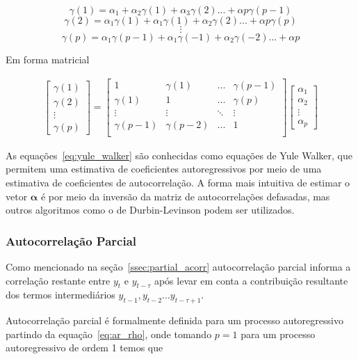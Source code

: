 $$\gamma(1) = \alpha_{1} + \alpha_{2}\gamma(1) + \alpha_{3}\gamma(2) ... + \alpha{p}\gamma(p-1)$$
$$\gamma(2) = \alpha_{1}\gamma(1) + \alpha_{1}\gamma(1) + \alpha_{2}\gamma(2) ... + \alpha{p}\gamma(p)$$
$$\vdots$$
$$\gamma(p) = \alpha_{1}\gamma(p-1) + \alpha_{1}\gamma(-1) + \alpha_{2}\gamma(-2) ... + \alpha{p}$$

Em forma matricial

\begin{gather}\label{eq:yule_walker}
  \begin{bmatrix} \gamma(1) \\ \gamma(2) \\ \vdots \\ \gamma(p) \end{bmatrix}
  =
  \begin{bmatrix}
      1 & \gamma(1) & ... & \gamma(p-1) \\
      \gamma(1) & 1 & ... & \gamma(p) \\
      \vdots & \vdots & \ddots & \vdots \\
      \gamma(p-1) & \gamma(p-2) & ... & 1 \\
  \end{bmatrix}
  \begin{bmatrix} \alpha_{1} \\ \alpha_{2} \\ \vdots \\ \alpha_{p} \end{bmatrix}
\end{gather}

As equações~\ref{eq:yule_walker} são conhecidas como equações de Yule Walker,
que permitem uma estimativa de coeficientes autoregressivos por meio de uma
estimativa de coeficientes de autocorrelação. A forma mais intuitiva de estimar
o vetor $\mathbf{\alpha}$ é por meio da inversão da matriz de autocorrelações
defasadas, mas outros algoritmos como o de Durbin-Levinson podem ser utilizados.

\subsubsection{Autocorrelação Parcial}

Como mencionado na seção~\ref{ssec:partial_acorr} autocorrelação parcial
informa a correlação restante entre $y_t$ e $y_{t-\tau}$ após levar em
conta a contribuição resultante dos termos intermediários $y_{t-1}, y_{t-2}
... y_{t-\tau+1}$.

Autocorrelação parcial é formalmente definida para um processo autoregressivo
partindo da equação~\ref{eq:ar_rho}, onde tomando $p=1$ para um processo
autoregressivo de ordem 1 temos que

